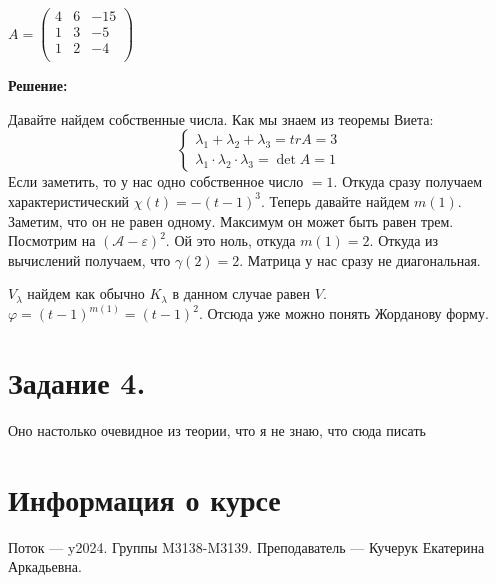 \documentclass{article}
\begin{document}
$A = \begin{pmatrix}
    4 & 6 & -15 \\
    1& 3  & -5 \\
    1 & 2 & -4 \\
\end{pmatrix}$

\textbf{Решение:}

Давайте найдем собственные числа. Как мы знаем из теоремы Виета:
$$\begin{cases}
    \lambda_1 + \lambda_2 + \lambda_3 = tr A = 3\\
    \lambda_1 \cdot \lambda_2 \cdot \lambda_3 = \det A = 1
\end{cases}$$
Если заметить, то у нас одно собственное число $ = 1$. Откуда сразу получаем характеристический $\chi(t) = -(t-1)^3$. Теперь давайте найдем $m(1)$. Заметим, что он не равен одному. Максимум он может быть равен трем. Посмотрим на $(\mathcal{A}-\varepsilon)^2$. Ой это ноль, откуда $m(1) = 2$. Откуда из вычислений получаем, что $\gamma(2)= 2$. Матрица у нас сразу не диагональная.

$V_\lambda$ найдем как обычно $K_\lambda$ в данном случае равен $V$. $\varphi = (t-1)^{m(1)}=(t-1)^2$. Отсюда уже можно понять Жорданову форму.

\newpage
\section{Задание 4.}

Оно настолько очевидное из теории, что я не знаю, что сюда писать













\newpage
\section{Информация о курсе}

Поток — y2024.\newline
Группы M3138-M3139.\newline
Преподаватель --- Кучерук Екатерина Аркадьевна.\par
\end{document}

